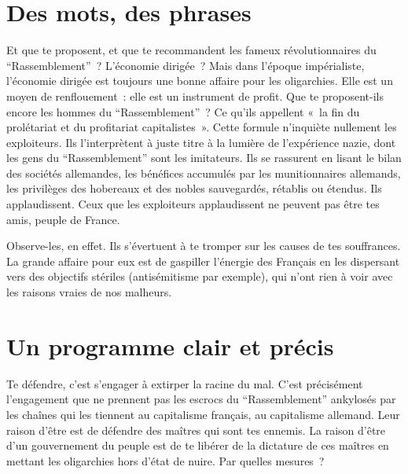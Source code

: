 \documentclass[french,twoside]{book} %
\begin{document}
\section[{Des mots, des phrases}]{Des mots, des phrases}
\noindent Et que te proposent, et que te recommandent les fameux révolutionnaires du “Rassemblement” ? L’économie dirigée ? Mais dans l’époque impérialiste, l’économie dirigée est toujours une bonne affaire pour les oligarchies. Elle est un moyen de renflouement : elle est un instrument de profit. Que te proposent-ils encore les hommes du “Rassemblement” ? Ce qu’ils appellent « la fin du prolétariat et du profitariat capitalistes ». Cette formule n’inquiète nullement les exploiteurs. Ils l’interprètent à juste titre à la lumière de l’expérience nazie, dont les gens du “Rassemblement” sont les imitateurs. Ils se rassurent en lisant le bilan des sociétés allemandes, les bénéfices accumulés par les munitionnaires allemands, les privilèges des hobereaux et des nobles sauvegardés, rétablis ou étendus. Ils applaudissent. Ceux que les exploiteurs applaudissent ne peuvent pas être tes amis, peuple de France.\par
Observe-les, en effet. Ils s’évertuent à te tromper sur les causes de tes souffrances. La grande affaire pour eux est de gaspiller l’énergie des Français en les dispersant vers des objectifs stériles (antisémitisme par exemple), qui n’ont rien à voir avec les raisons vraies de nos malheurs.
\section[{Un programme clair et précis}]{Un programme clair et précis}
\noindent Te défendre, c’est s’engager à extirper la racine du mal. C’est précisément l’engagement que ne prennent pas les escrocs du “Rassemblement” ankylosés par les chaînes qui les tiennent au capitalisme français, au capitalisme allemand. Leur raison d’être est de défendre des maîtres qui sont tes ennemis. La raison d’être d’un gouvernement du peuple est de te libérer de la dictature de ces maîtres en mettant les oligarchies hors d’état de nuire. Par quelles mesures ?\par
\end{document}
